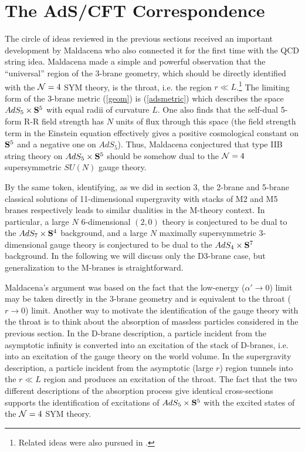 \section{The AdS/CFT Correspondence}

The circle of ideas reviewed in the previous sections received
an important development by Maldacena \cite{jthroat} who also connected
it for the first time with the QCD string idea. Maldacena made
a simple and powerful observation that the ``universal'' region of
the 3-brane geometry, which should be directly identified with the
${\cal N}=4$ SYM theory, is the throat, i.e. the region $r\ll L$.\footnote{
Related ideas were also pursued in \cite{HYU}.} The
limiting form of the 3-brane metric (\ref{geom}) is (\ref{adsmetric})
which describes the space
$AdS_5\times {\bf S}^5$ with equal radii of curvature $L$.
One also finds that the self-dual 5-form R-R field strength
has $N$ units of flux through this space (the field strength term in the
Einstein equation effectively gives a positive cosmological 
constant on ${\bf S}^5$
and a negative one on $AdS_5$).
Thus, Maldacena conjectured that type IIB string theory on 
$AdS_5\times {\bf S}^5$
should be somehow dual to the 
${\cal N}=4$ supersymmetric
$SU(N)$ gauge theory.

By the same token, identifying, as we did in section 3,
the 2-brane and 5-brane
classical solutions
of 11-dimensional supergravity with stacks of M2 and M5 branes respectively
leads to similar dualities in the M-theory
context. In particular, a large $N$ 6-dimensional $(2,0)$ theory
is conjectured to be dual to the $AdS_7\times {\bf S}^4$ background,
and a large $N$ maximally supersymmetric 3-dimensional
gauge theory is conjectured to be dual to the $AdS_4\times {\bf S}^7$
background. In the following we will discuss only the
D3-brane case, but generalization to the M-branes is straightforward.

Maldacena's argument was based on the fact that the low-energy
($\alpha'\rightarrow 0$) limit may be taken directly in the 3-brane
geometry and is equivalent to the throat ($r \rightarrow 0$) limit.
Another way to motivate the identification of the gauge theory
with the throat is to think about the absorption of massless particles
considered in the previous section. In the D-brane description,
a particle incident from the asymptotic infinity 
is converted into an excitation of the stack of D-branes, i.e. into
an excitation of the gauge theory on the world volume.
In the supergravity description, a particle incident from the asymptotic 
(large $r$) region tunnels into the $r\ll L$ region and produces an excitation
of the throat. The fact that the two different descriptions of
the absorption process give identical cross-sections supports the 
identification of excitations of $AdS_5\times {\bf S}^5$ with the excited
states of the ${\cal N}=4$ SYM theory.

